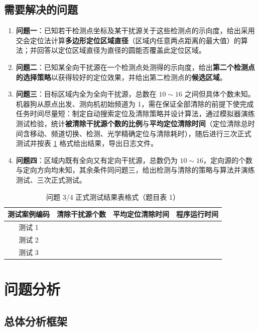 \documentclass[withoutpreface,bwprint]{cumcmthesis}
\begin{document}
\subsection{需要解决的问题}

\begin{enumerate}
  \item \textbf{问题一}：已知若干检测点坐标及某干扰源关于这些检测点的示向度，给出采用交会定位法计算\textbf{多边形定位区域直径}（区域内任意两点距离的最大值）的算法；并回答以定位区域直径为直径的圆能否覆盖此定位区域。
  \item \textbf{问题二}：已知某全向干扰源在一个检测点处测得的示向度，给出\textbf{第二个检测点的选择策略}以获得较好的定位效果，并给出第二检测点的\textbf{候选区域}。
  \item \textbf{问题三}：目标区域内全为全向干扰源，总数在 $10\sim16$ 之间但具体个数未知。机器狗从原点出发、测向机初始频道为 1，需在保证全部清除的前提下使完成任务时间尽量短：制定自动搜索定位及清除策略并设计算法，通过模拟器演练测试检验，统计\textbf{被清除干扰源个数的比例}与\textbf{平均定位清除时间}（定位清除总时间含移动、频道切换、检测、光学精确定位与清除耗时），随后进行三次正式测试并按表 \ref{tab:formal} 格式给出结果，导出日志文件。
  \item \textbf{问题四}：区域内既有全向又有定向干扰源，总数仍为 $10\sim16$，定向源的个数与定向方向均未知，其余条件同问题三，给出检测与清除的策略与算法并演练测试、三次正式测试。
\end{enumerate}

\begin{table}[H]
\centering
\caption{问题 3/4 正式测试结果表格式（题目表 1）}\label{tab:formal}
\begin{tabular}{cccc}
\toprule
测试案例编码 & 清除干扰源个数 & 平均定位清除时间 & 程序运行时间\\
\midrule
测试 1 &&& \\
测试 2 &&& \\
测试 3 &&& \\
\bottomrule
\end{tabular}
\end{table}

\section{问题分析}

\subsection{总体分析框架}
\end{document}
